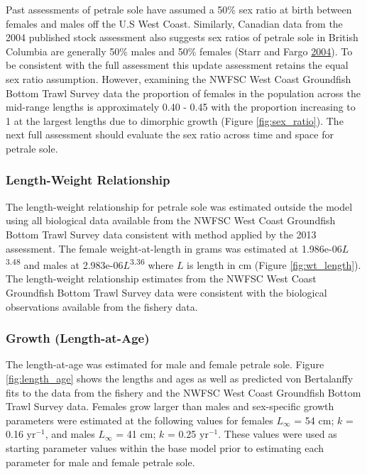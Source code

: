 \documentclass[12pt,]{article}
\begin{document}
Past assessments of petrale sole have assumed a 50\% sex ratio at birth
between females and males off the U.S West Coast. Similarly, Canadian
data from the 2004 published stock assessment also suggests sex ratios
of petrale sole in British Columbia are generally 50\% males and 50\%
females (Starr and Fargo
\protect\hyperlink{ref-starr_petrale_2004}{2004}). To be consistent with
the full assessment this update assessment retains the equal sex ratio
assumption. However, examining the NWFSC West Coast Groundfish Bottom
Trawl Survey data the proportion of females in the population across the
mid-range lengths is approximately 0.40 - 0.45 with the proportion
increasing to 1 at the largest lengths due to dimorphic growth (Figure
\ref{fig:sex_ratio}). The next full assessment should evaluate the sex
ratio across time and space for petrale sole.

\subsubsection{Length-Weight
Relationship}\label{length-weight-relationship}

The length-weight relationship for petrale sole was estimated outside
the model using all biological data available from the NWFSC West Coast
Groundfish Bottom Trawl Survey data consistent with method applied by
the 2013 assessment. The female weight-at-length in grams was estimated
at 1.986e-06\(L\)\textsuperscript{3.48} and males at
2.983e-06\(L\)\textsuperscript{3.36} where \(L\) is length in cm (Figure
\ref{fig:wt_length}). The length-weight relationship estimates from the
NWFSC West Coast Groundfish Bottom Trawl Survey data were consistent
with the biological observations available from the fishery data.

\subsubsection{Growth (Length-at-Age)}\label{growth-length-at-age}

The length-at-age was estimated for male and female petrale sole. Figure
\ref{fig:length_age} shows the lengths and ages as well as predicted von
Bertalanffy fits to the data from the fishery and the NWFSC West Coast
Groundfish Bottom Trawl Survey data. Females grow larger than males and
sex-specific growth parameters were estimated at the following values
for females \(L_{\infty}\) = 54 cm; \(k\) = 0.16 \(\text{yr}^{-1}\), and
males \(L_{\infty}\) = 41 cm; \(k\) = 0.25 \(\text{yr}^{-1}\). These
values were used as starting parameter values within the base model
prior to estimating each parameter for male and female petrale sole.
\end{document}
